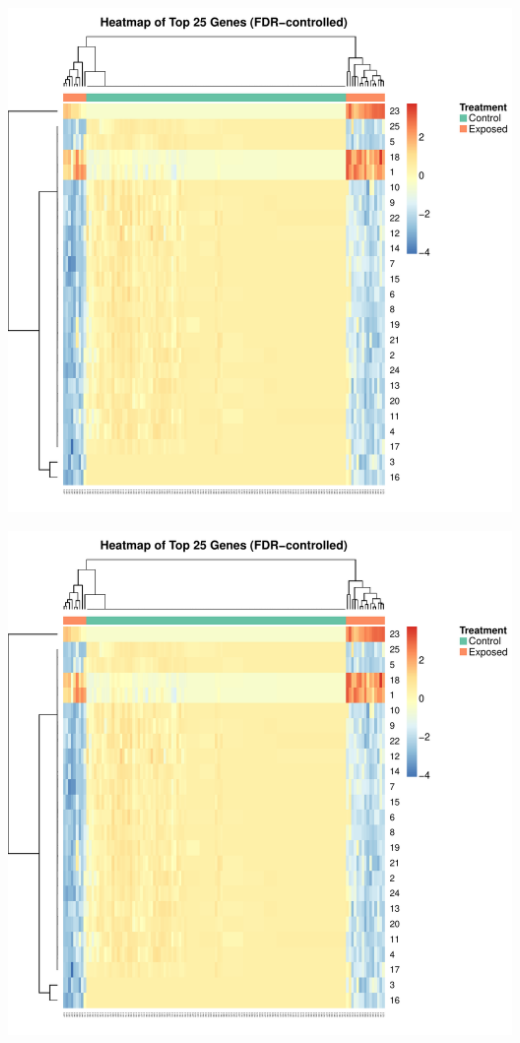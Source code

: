 \documentclass[landscape,a0paper,fontscale=0.285]{baposter} %
\newcommand{\1}{\mathbbm{1}}
\begin{document}
\begin{poster}
{\begin{multicols}{2}
\begin{center}
\vspace*{-0.5cm}
\includegraphics[scale=0.37]{topGenesHeatmap}
\end{center}

\begin{center}
\includegraphics[scale=0.39]{topGenesHeatmap}
\end{center}


\end{multicols}}
\end{poster}
\end{document}
